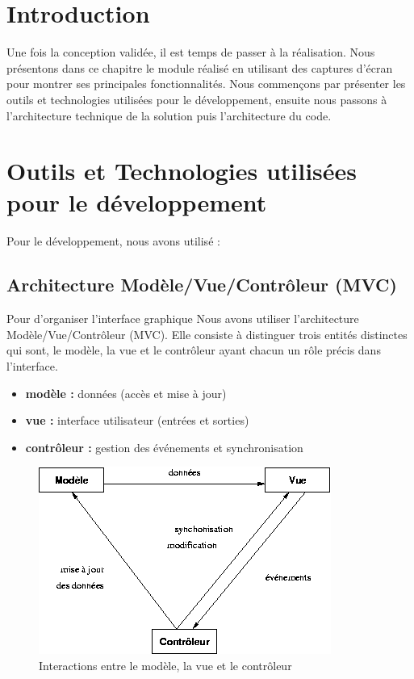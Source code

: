 \section{Introduction}
Une fois la conception validée, il est temps de passer à la réalisation. Nous présentons dans ce chapitre le module réalisé en utilisant des captures d’écran pour montrer ses principales fonctionnalités. Nous commençons par présenter les outils et technologies utilisées pour le développement, ensuite nous passons à l’architecture technique de la solution puis l’architecture du code.

\section{Outils et Technologies utilisées pour le développement}
Pour le développement,  nous avons utilisé : 

    \subsection{Architecture Modèle/Vue/Contrôleur (MVC)}


Pour d'organiser  l'interface graphique Nous avons utiliser l'architecture Modèle/Vue/Contrôleur (MVC).  Elle consiste à distinguer trois entités distinctes qui sont, le modèle, la vue et le contrôleur ayant chacun un rôle précis dans l'interface. \parencite{mvc}

\begin{itemize}
	\item 	\textbf{modèle :} données (accès et mise à jour)
	\item 	\textbf{vue :} interface utilisateur (entrées et sorties)
	\item 	\textbf{contrôleur :} gestion des événements et synchronisation
\end{itemize}


\begin{figure}[H]
	\centering
	\includegraphics[width=0.6\linewidth]{images/mvc}
	\caption{Interactions entre le modèle, la vue et le contrôleur \parencite{mvc}}
	\label{fig:mvc}
\end{figure}

